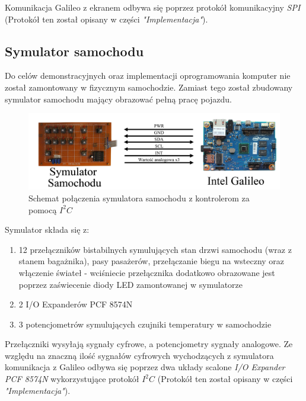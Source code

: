 \documentclass{xmgr}
\begin{document}
Komunikacja Galileo z ekranem odbywa się poprzez protokół komunikacyjny \emph{SPI} (Protokół ten został opisany w części \emph{"Implementacja"}).

\subsection{Symulator samochodu}
Do celów demonstracyjnych oraz implementacji oprogramowania komputer nie został zamontowany w fizycznym samochodzie. Zamiast tego został zbudowany symulator samochodu mający obrazować pełną pracę pojazdu.

\begin{figure}[!h]
    \centering
    \includegraphics[height=0.17\textheight]{images/symulatorGalileo.jpg}
    \caption{Schemat połączenia symulatora samochodu z kontrolerom za pomocą $I^2C$}
\end{figure}

Symulator składa się z:
\begin{enumerate}
	\item 12 przełączników bistabilnych symulujących stan drzwi samochodu (wraz z stanem bagażnika), pasy pasażerów, przełączanie biegu na wsteczny oraz włączenie świateł - wciśniecie przełącznika dodatkowo obrazowane jest poprzez zaświecenie diody LED zamontowanej w symulatorze
	\item 2 I/O Expanderów PCF 8574N 
	\item 3 potencjometrów symulujących czujniki temperatury w samochodzie
\end{enumerate}

Przełączniki wysyłają sygnały cyfrowe, a potencjometry sygnały analogowe. Ze względu na znaczną ilość sygnałów cyfrowych wychodzących z symulatora komunikacja z Galileo odbywa się poprzez dwa układy scalone \emph{I/O Expander PCF 8574N} wykorzystujące protokół  $I^2C$ (Protokół ten został opisany w części \emph{"Implementacja"}).

\end{document}

